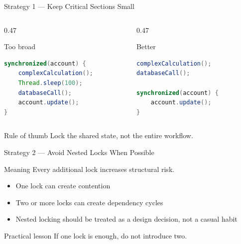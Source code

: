 \documentclass[aspectratio=169,11pt]{beamer}
\begin{document}
	\begin{frame}[fragile]{Strategy 1 --- Keep Critical Sections Small}
		\begin{columns}[T]
			\begin{column}{0.47\textwidth}
				\begin{block}{Too broad}
					\begin{lstlisting}[language=Java]
synchronized(account) {
	complexCalculation();
	Thread.sleep(100);
	databaseCall();
	account.update();
}
					\end{lstlisting}
				\end{block}
			\end{column}
			\begin{column}{0.47\textwidth}
				\begin{block}{Better}
					\begin{lstlisting}[language=Java]
complexCalculation();
databaseCall();
						
synchronized(account) {
	account.update();
}
					\end{lstlisting}
				\end{block}
			\end{column}
		\end{columns}
		
		\vspace{0.2cm}
		\begin{alertblock}{Rule of thumb}
			Lock the shared state, not the entire workflow.
		\end{alertblock}
	\end{frame}
	
	\begin{frame}{Strategy 2 --- Avoid Nested Locks When Possible}
		\begin{block}{Meaning}
			Every additional lock increases structural risk.
		\end{block}
		
		\bigskip
		
		\begin{itemize}
			\item One lock can create contention
			\item Two or more locks can create dependency cycles
			\item Nested locking should be treated as a design decision, not a casual habit
		\end{itemize}
		
		\bigskip
		
		\begin{alertblock}{Practical lesson}
			If one lock is enough, do not introduce two.
		\end{alertblock}
	\end{frame}
	
\end{document}
